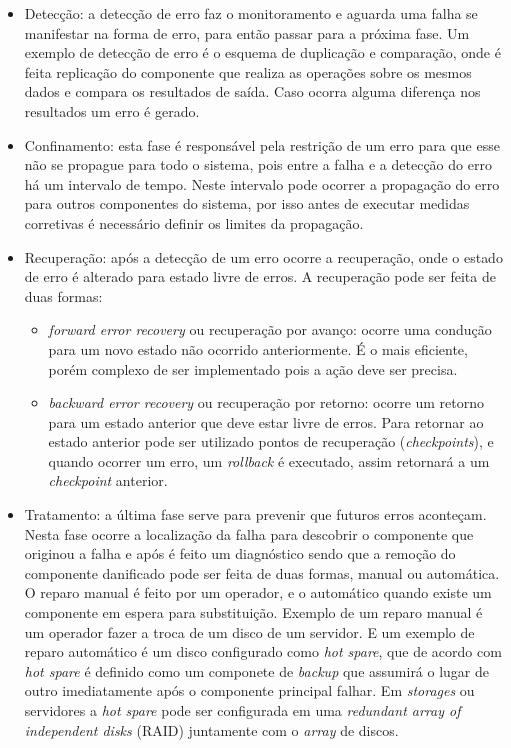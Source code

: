 \begin{itemize}
 \item Detecção: a detecção de erro faz o monitoramento e aguarda uma falha se manifestar na forma de erro, para então
 passar para a próxima fase. Um exemplo de detecção de erro é o esquema de duplicação e comparação, onde é feita replicação do componente
 que realiza as operações sobre os mesmos dados e compara os resultados de saída. Caso ocorra alguma diferença nos resultados um erro é gerado.
 \item Confinamento: esta fase é responsável pela restrição de um erro para que esse não se propague para todo o sistema, pois entre a falha e a
 detecção do erro há um intervalo de tempo. Neste intervalo pode ocorrer a propagação do erro para outros componentes do sistema, por isso 
 antes de executar medidas corretivas é necessário definir os limites da propagação.
 \item Recuperação: após a detecção de um erro ocorre a recuperação, onde o estado de erro é alterado para estado livre de erros. A recuperação
 pode ser feita de duas formas:
 \begin{itemize}
  \item \textit{forward error recovery} ou recuperação por avanço: ocorre uma condução para um novo estado não ocorrido anteriormente. É o mais 
  eficiente, porém complexo de ser implementado pois a ação deve ser precisa.
  \item \textit{backward error recovery} ou recuperação por retorno: ocorre um retorno para um estado anterior que deve estar livre de erros.
  Para retornar ao estado anterior pode ser utilizado pontos de recuperação (\textit{checkpoints}), e quando ocorrer um erro, um \textit{rollback} 
  é executado, assim retornará a um \textit{checkpoint} anterior.
 \end{itemize}
 \item Tratamento: a última fase serve para prevenir que futuros erros aconteçam. Nesta fase ocorre a localização da falha para descobrir o 
 componente que originou a falha e após é feito um diagnóstico sendo que a remoção do componente danificado pode ser feita de duas formas, 
 manual ou automática. O reparo manual é feito por um operador, e o automático quando existe um componente em espera para substituição.
 Exemplo de um reparo manual é um operador fazer a troca de um disco de um servidor. E um exemplo de reparo automático é um disco configurado
 como \textit{hot spare}, que de acordo com \cite{rouse2013} \textit{hot spare} é definido como um componete de \textit{backup} que assumirá 
 o lugar de outro imediatamente após o componente principal falhar. Em \textit{storages} ou servidores a \textit{hot spare} pode ser configurada 
 em uma \textit{redundant array of independent disks} (RAID) juntamente com o \textit{array} de discos.
\end{itemize}


